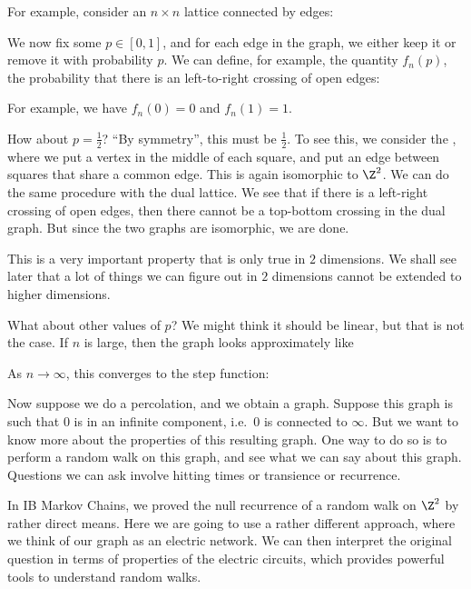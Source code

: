 \documentclass[a4paper]{article}
\begin{document}
For example, consider an $n \times n$ lattice connected by edges:
\begin{center}
\end{center}
We now fix some $p \in [0, 1]$, and for each edge in the graph, we either keep it or remove it with probability $p$. We can define, for example, the quantity $f_n(p)$, the probability that there is an left-to-right crossing of open edges: %

For example, we have $f_n(0) = 0$ and $f_n(1) = 1$.

How about $p = \frac{1}{2}$? ``By symmetry'', this must be $\frac{1}{2}$. To see this, we consider the , where we put a vertex in the middle of each square, and put an edge between squares that share a common edge. This is again isomorphic to $\Z^2$. We can do the same procedure with the dual lattice. We see that if there is a left-right crossing of open edges, then there cannot be a top-bottom crossing in the dual graph. But since the two graphs are isomorphic, we are done. %

This is a very important property that is only true in $2$ dimensions. We shall see later that a lot of things we can figure out in $2$ dimensions cannot be extended to higher dimensions.

What about other values of $p$? We might think it should be linear, but that is not the case. If $n$ is large, then the graph looks approximately like


As $n \to \infty$, this converges to the step function:


Now suppose we do a percolation, and we obtain a graph. Suppose this graph is such that $0$ is in an infinite component, i.e.\ $0$ is connected to $\infty$. But we want to know more about the properties of this resulting graph. One way to do so is to perform a random walk on this graph, and see what we can say about this graph. Questions we can ask involve hitting times or transience or recurrence.

In IB Markov Chains, we proved the null recurrence of a random walk on $\Z^2$ by rather direct means. Here we are going to use a rather different approach, where we think of our graph as an electric network. We can then interpret the original question in terms of properties of the electric circuits, which provides powerful tools to understand random walks.
\end{document}
